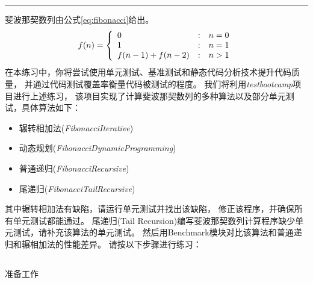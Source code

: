 \documentclass[12pt,addpoints,fleqn]{exam}
\begin{document}
\noindent
\rule[2ex]{\textwidth}{2pt}

\newpage

\begin{questions}
  \pointsinrightmargin
  \setlength{\rightpointsmargin}{2cm}
  \CorrectChoiceEmphasis{\color{red}\itshape}

\newpage
\question[40] 斐波那契数列由公式\ref{eq:fibonacci}给出。
\begin{equation}
    \label{eq:fibonacci}
    f(n)=\left\{
        \begin{array}{l@{\quad:\quad}l}
            0  & n=0 \\
            1  & n=1 \\
            f(n-1) + f(n-2) & n>1
        \end{array}
    \right.
\end{equation}
在本练习中，你将尝试使用单元测试、基准测试和静态代码分析技术提升代码质量，
并通过代码测试覆盖率衡量代码被测试的程度。
我们将利用\emph{testbootcamp}项目进行上述练习，
该项目实现了计算斐波那契数列的多种算法以及部分单元测试，具体算法如下：
\begin{itemize}
    \item 辗转相加法(\emph{FibonacciIterative})
    \item 动态规划(\emph{FibonacciDynamicProgramming})
    \item 普通递归(\emph{FibonacciRecursive})
    \item 尾递归(\emph{FibonacciTailRecursive})
\end{itemize}

其中辗转相加法有缺陷，请运行单元测试并找出该缺陷，
修正该程序，并确保所有单元测试都能通过。
尾递归(Tail Recursion)编写斐波那契数列计算程序缺少单元测试，请补充该算法的单元测试。
然后用Benchmark模块对比该算法和普通递归和辗相加法的性能差异。
请按以下步骤进行练习：


\newpage
\begin{parts}
  \part{}准备工作


\end{parts}
\end{questions}
\end{document}
